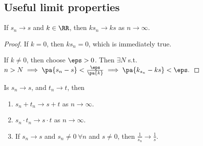 \documentclass[11pt]{scrartcl}
\numberwithin{equation}{section}
\begin{document}
\subsection{Useful limit properties}
\begin{proposition}
    If $s_n\rightarrow s$  and $k \in \RR$,  then $ks_n \rightarrow ks$
    as $n\rightarrow\infty$.
\end{proposition}
\begin{proof}
    If $k=0$, then $ks_n = 0$, which is immediately true.
    
    If $k\neq 0$, then choose $\eps >0$. Then $\exists N$ s.t. 
    $n>N \implies \pa{s_n-s}<\frac{\eps}{\pa{k}} \implies 
    \pa{k_{s_n}-ks} < \eps.$
\end{proof}
\begin{proposition}
    Is $s_n\rightarrow s$, and $t_n\rightarrow t$, then
    \begin{enumerate}
        \item $s_n+t_n \rightarrow s+t$ as $n\rightarrow \infty.$
        \item $s_n\cdot t_n \rightarrow s\cdot t$ as $n\rightarrow \infty.$
        \item If $s_n\rightarrow s$ and $s_n\neq 0 \ \forall n$ and $s\neq0$,
        then $\frac{1}{s_n}\rightarrow \frac{1}{s}$.
    \end{enumerate} 
\end{proposition}
\end{document}

